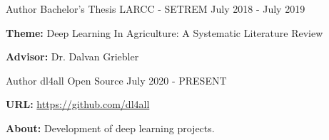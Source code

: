 
\begin{cventries}
	\cventry
	{Author} %
	{Bachelor's Thesis} %
	{LARCC - SETREM} %
	{July 2018 - July 2019} %
	{
		\begin{cvitems} %
			\item {\textbf{Theme:} Deep Learning In Agriculture: A Systematic Literature Review}
			\item {\textbf{Advisor:} Dr. Dalvan Griebler}
		\end{cvitems}
	}

	\cventry
	{Author} %
	{dl4all} %
	{Open Source} %
	{July 2020 - PRESENT} %
	{
		\begin{cvitems} %
			\item {\textbf{URL:} \href{https://github.com/dl4all}{https://github.com/dl4all}}
			\item {\textbf{About:} Development of deep learning projects.}
		\end{cvitems}
	}
\end{cventries}
